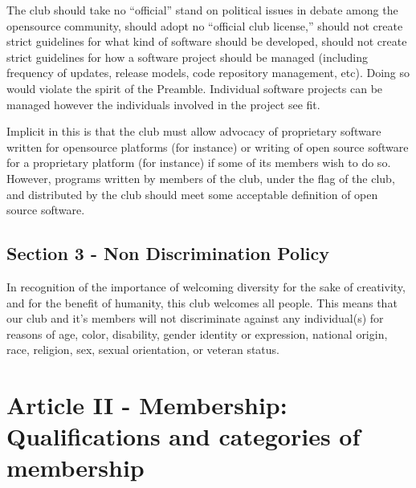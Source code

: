 \documentclass{article}
\begin{document}
	The club should take no ``official'' stand on political issues in debate among the opensource community, should adopt no ``official club license,'' should not create strict guidelines for what kind of software should be developed, should not create strict guidelines for how a software project should be managed (including frequency of updates, release models, code repository management, etc). Doing so would violate the spirit of the Preamble. Individual software projects can be managed however the individuals involved in the project see fit.

	Implicit in this is that the club must allow advocacy of proprietary software written for opensource platforms (for instance) or writing of open source software for a proprietary platform (for instance) if some of its members wish to do so. However, programs written by members of the club, under the flag of the club, and distributed by the club should meet some acceptable definition of open source software.

	\subsection{Section 3 - Non Discrimination Policy}

	In recognition of the importance of welcoming diversity for the sake of creativity, and for the benefit of humanity, this club welcomes all people. This means that our club and it's members will not discriminate against any individual(s) for reasons of age, color, disability, gender identity or expression, national origin, race, religion, sex, sexual orientation, or veteran status.

	\section{Article II - Membership: Qualifications and categories of membership}


\end{document}
